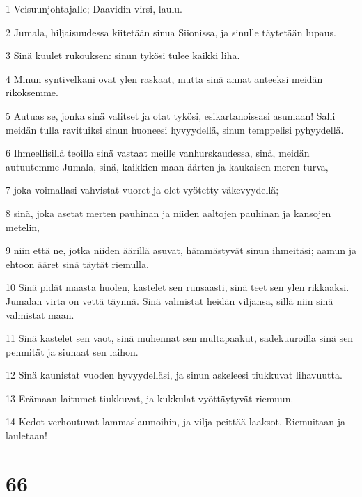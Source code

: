 \par 1 Veisuunjohtajalle; Daavidin virsi, laulu.
\par 2 Jumala, hiljaisuudessa kiitetään sinua Siionissa, ja sinulle täytetään lupaus.
\par 3 Sinä kuulet rukouksen: sinun tykösi tulee kaikki liha.
\par 4 Minun syntivelkani ovat ylen raskaat, mutta sinä annat anteeksi meidän rikoksemme.
\par 5 Autuas se, jonka sinä valitset ja otat tykösi, esikartanoissasi asumaan! Salli meidän tulla ravituiksi sinun huoneesi hyvyydellä, sinun temppelisi pyhyydellä.
\par 6 Ihmeellisillä teoilla sinä vastaat meille vanhurskaudessa, sinä, meidän autuutemme Jumala, sinä, kaikkien maan äärten ja kaukaisen meren turva,
\par 7 joka voimallasi vahvistat vuoret ja olet vyötetty väkevyydellä;
\par 8 sinä, joka asetat merten pauhinan ja niiden aaltojen pauhinan ja kansojen metelin,
\par 9 niin että ne, jotka niiden äärillä asuvat, hämmästyvät sinun ihmeitäsi; aamun ja ehtoon ääret sinä täytät riemulla.
\par 10 Sinä pidät maasta huolen, kastelet sen runsaasti, sinä teet sen ylen rikkaaksi. Jumalan virta on vettä täynnä. Sinä valmistat heidän viljansa, sillä niin sinä valmistat maan.
\par 11 Sinä kastelet sen vaot, sinä muhennat sen multapaakut, sadekuuroilla sinä sen pehmität ja siunaat sen laihon.
\par 12 Sinä kaunistat vuoden hyvyydelläsi, ja sinun askeleesi tiukkuvat lihavuutta.
\par 13 Erämaan laitumet tiukkuvat, ja kukkulat vyöttäytyvät riemuun.
\par 14 Kedot verhoutuvat lammaslaumoihin, ja vilja peittää laaksot. Riemuitaan ja lauletaan!

\chapter{66}

